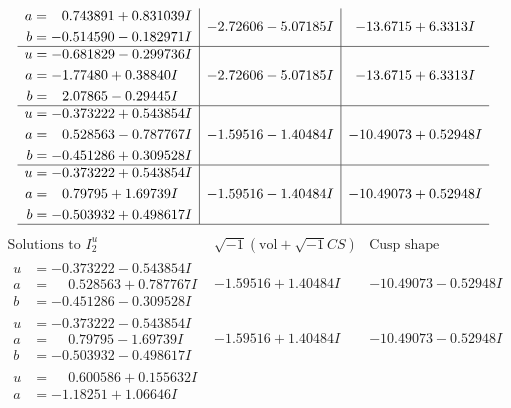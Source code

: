 \documentclass[1p]{elsarticle_modified}
\theoremstyle{definition}
\newcommand{\I}{\sqrt{-1}}
\begin{document}
$$\begin{array}{c|c|c}
\begin{aligned}
a &= \phantom{-}0.743891 + 0.831039 I \\
b &= -0.514590 - 0.182971 I\end{aligned}
 & -2.72606 - 5.07185 I & -13.6715 + 6.3313 I \\ \hline\begin{aligned}
u &= -0.681829 - 0.299736 I \\
a &= -1.77480 + 0.38840 I \\
b &= \phantom{-}2.07865 - 0.29445 I\end{aligned}
 & -2.72606 - 5.07185 I & -13.6715 + 6.3313 I \\ \hline\begin{aligned}
u &= -0.373222 + 0.543854 I \\
a &= \phantom{-}0.528563 - 0.787767 I \\
b &= -0.451286 + 0.309528 I\end{aligned}
 & -1.59516 - 1.40484 I & -10.49073 + 0.52948 I \\ \hline\begin{aligned}
u &= -0.373222 + 0.543854 I \\
a &= \phantom{-}0.79795 + 1.69739 I \\
b &= -0.503932 + 0.498617 I\end{aligned}
 & -1.59516 - 1.40484 I & -10.49073 + 0.52948 I\\
 \hline 
 \end{array}$$\newpage$$\begin{array}{c|c|c}  
\text{Solutions to }I^u_{2}& \I (\text{vol} + \sqrt{-1}CS) & \text{Cusp shape}\\
 \hline 
\begin{aligned}
u &= -0.373222 - 0.543854 I \\
a &= \phantom{-}0.528563 + 0.787767 I \\
b &= -0.451286 - 0.309528 I\end{aligned}
 & -1.59516 + 1.40484 I & -10.49073 - 0.52948 I \\ \hline\begin{aligned}
u &= -0.373222 - 0.543854 I \\
a &= \phantom{-}0.79795 - 1.69739 I \\
b &= -0.503932 - 0.498617 I\end{aligned}
 & -1.59516 + 1.40484 I & -10.49073 - 0.52948 I \\ \hline\begin{aligned}
u &= \phantom{-}0.600586 + 0.155632 I \\
a &= -1.18251 + 1.06646 I \\

\end{aligned}
\end{array}$$
\end{document}
